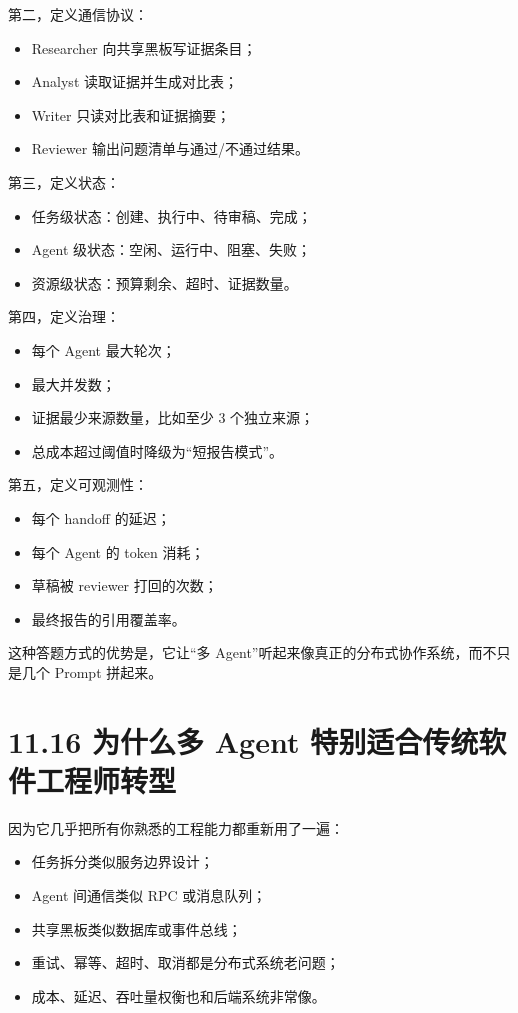 第二，定义通信协议：


\begin{itemize}[leftmargin=2em]
\item Researcher 向共享黑板写证据条目；
\item Analyst 读取证据并生成对比表；
\item Writer 只读对比表和证据摘要；
\item Reviewer 输出问题清单与通过/不通过结果。
\end{itemize}

第三，定义状态：


\begin{itemize}[leftmargin=2em]
\item 任务级状态：创建、执行中、待审稿、完成；
\item Agent 级状态：空闲、运行中、阻塞、失败；
\item 资源级状态：预算剩余、超时、证据数量。
\end{itemize}

第四，定义治理：


\begin{itemize}[leftmargin=2em]
\item 每个 Agent 最大轮次；
\item 最大并发数；
\item 证据最少来源数量，比如至少 3 个独立来源；
\item 总成本超过阈值时降级为``短报告模式''。
\end{itemize}

第五，定义可观测性：


\begin{itemize}[leftmargin=2em]
\item 每个 handoff 的延迟；
\item 每个 Agent 的 token 消耗；
\item 草稿被 reviewer 打回的次数；
\item 最终报告的引用覆盖率。
\end{itemize}

这种答题方式的优势是，它让``多 Agent''听起来像真正的分布式协作系统，而不只是几个 Prompt 拼起来。


\section{11.16 为什么多 Agent 特别适合传统软件工程师转型}

因为它几乎把所有你熟悉的工程能力都重新用了一遍：


\begin{itemize}[leftmargin=2em]
\item 任务拆分类似服务边界设计；
\item Agent 间通信类似 RPC 或消息队列；
\item 共享黑板类似数据库或事件总线；
\item 重试、幂等、超时、取消都是分布式系统老问题；
\item 成本、延迟、吞吐量权衡也和后端系统非常像。
\end{itemize}

